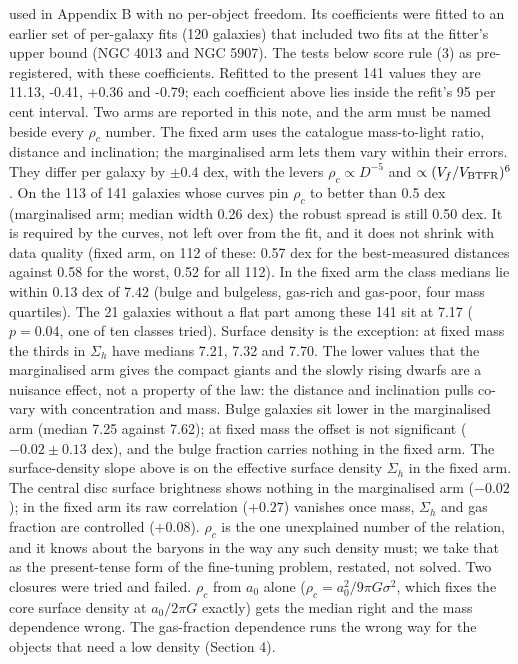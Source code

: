 \documentclass[
  10pt,
]{article}
\begin{document}
used in Appendix B with no per-object freedom. Its coefficients were fitted to an earlier set of per-galaxy fits (120 galaxies) that included two fits at the fitter's upper bound (NGC 4013 and NGC 5907). The tests below score rule (3) as pre-registered, with these coefficients. Refitted to the present 141 values they are 11.13, -0.41, +0.36 and -0.79; each coefficient above lies inside the refit's 95 per cent interval. Two arms are reported in this note, and the arm must be named beside every $\rho_c$ number. The fixed arm uses the catalogue mass-to-light ratio, distance and inclination; the marginalised arm lets them vary within their errors. They differ per galaxy by $\pm0.4$ dex, with the levers $\rho_c\propto D^{-5}$ and $\propto(V_f/V_{\rm BTFR})^{6}$. On the 113 of 141 galaxies whose curves pin $\rho_c$ to better than 0.5 dex (marginalised arm; median width 0.26 dex) the robust spread is still 0.50 dex. It is required by the curves, not left over from the fit, and it does not shrink with data quality (fixed arm, on 112 of these: 0.57 dex for the best-measured distances against 0.58 for the worst, 0.52 for all 112). In the fixed arm the class medians lie within 0.13 dex of 7.42 (bulge and bulgeless, gas-rich and gas-poor, four mass quartiles). The 21 galaxies without a flat part among these 141 sit at 7.17 ($p=0.04$, one of ten classes tried). Surface density is the exception: at fixed mass the thirds in $\Sigma_h$ have medians 7.21, 7.32 and 7.70. The lower values that the marginalised arm gives the compact giants and the slowly rising dwarfs are a nuisance effect, not a property of the law: the distance and inclination pulls co-vary with concentration and mass. Bulge galaxies sit lower in the marginalised arm (median 7.25 against 7.62); at fixed mass the offset is not significant ($-0.02\pm0.13$ dex), and the bulge fraction carries nothing in the fixed arm. The surface-density slope above is on the effective surface density $\Sigma_h$ in the fixed arm. The central disc surface brightness shows nothing in the marginalised arm ($-0.02$); in the fixed arm its raw correlation ($+0.27$) vanishes once mass, $\Sigma_h$ and gas fraction are controlled ($+0.08$). $\rho_c$ is the one unexplained number of the relation, and it knows about the baryons in the way any such density must; we take that as the present-tense form of the fine-tuning problem, restated, not solved. Two closures were tried and failed. $\rho_c$ from $a_0$ alone ($\rho_c=a_0^2/9\pi G\sigma^2$, which fixes the core surface density at $a_0/2\pi G$ exactly) gets the median right and the mass dependence wrong. The gas-fraction dependence runs the wrong way for the objects that need a low density (Section 4).
\end{document}
